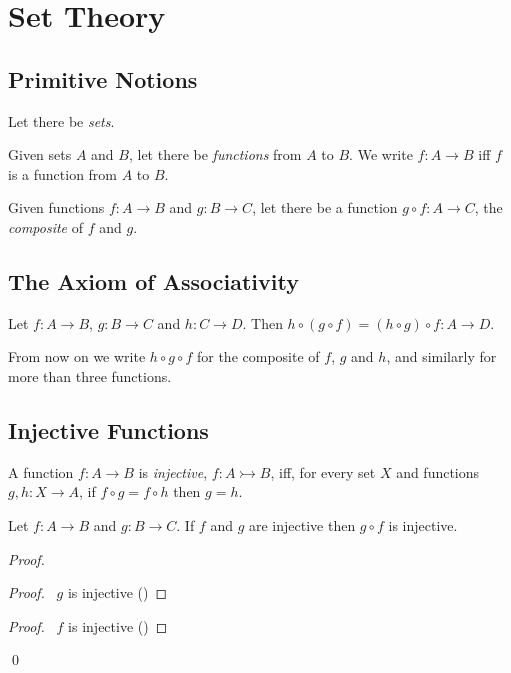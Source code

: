 \chapter{Set Theory}

\section{Primitive Notions}

Let there be \emph{sets}.

Given sets $A$ and $B$, let there be \emph{functions} from $A$ to $B$. We
write $f : A \rightarrow B$ iff $f$ is a function from $A$ to $B$.

Given functions $f : A \rightarrow B$ and $g : B \rightarrow C$, let there be
a function $g \circ f : A \rightarrow C$, the \emph{composite} of $f$ and $g$.

\section{The Axiom of Associativity}

\begin{ax}[Associativity]
  Let $f : A \rightarrow B$, $g : B \rightarrow C$ and $h : C \rightarrow D$.
  Then $h \circ (g \circ f) = (h \circ g) \circ f : A \rightarrow D$.
\end{ax}

From now on we write $h \circ g \circ f$ for the composite of $f$, $g$ and
$h$, and similarly for more than three functions.

\section{Injective Functions}

\begin{df}[Injective]
  A function $f : A \rightarrow B$ is \emph{injective}, $f : A
  \rightarrowtail B$, iff, for every set $X$ and functions $g, h : X
  \rightarrow
  A$, if $f \circ g = f \circ h$ then $g = h$.
\end{df}

\begin{prop}
\label{lm:sets:injective:comp}
 Let $f : A \rightarrow B$ and $g : B \rightarrow C$. If $f$ and $g$ are
injective then $g \circ f$ is injective.
\end{prop}

\begin{proof}
 \pf
 \begin{proof}
   \pf\ $g$ is injective ()
 \end{proof}
 \begin{proof}
   \pf\ $f$ is injective ()
 \end{proof}
 \qed
\end{proof}

